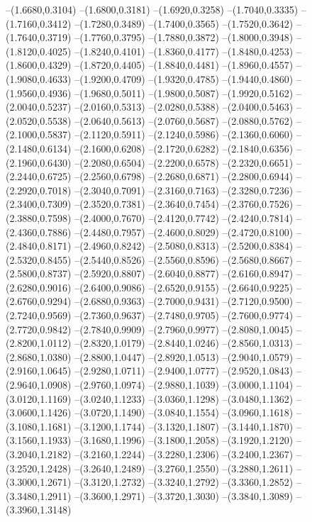 {\begin{scope}
--(1.6680,0.3104)
--(1.6800,0.3181)
--(1.6920,0.3258)
--(1.7040,0.3335)
--(1.7160,0.3412)
--(1.7280,0.3489)
--(1.7400,0.3565)
--(1.7520,0.3642)
--(1.7640,0.3719)
--(1.7760,0.3795)
--(1.7880,0.3872)
--(1.8000,0.3948)
--(1.8120,0.4025)
--(1.8240,0.4101)
--(1.8360,0.4177)
--(1.8480,0.4253)
--(1.8600,0.4329)
--(1.8720,0.4405)
--(1.8840,0.4481)
--(1.8960,0.4557)
--(1.9080,0.4633)
--(1.9200,0.4709)
--(1.9320,0.4785)
--(1.9440,0.4860)
--(1.9560,0.4936)
--(1.9680,0.5011)
--(1.9800,0.5087)
--(1.9920,0.5162)
--(2.0040,0.5237)
--(2.0160,0.5313)
--(2.0280,0.5388)
--(2.0400,0.5463)
--(2.0520,0.5538)
--(2.0640,0.5613)
--(2.0760,0.5687)
--(2.0880,0.5762)
--(2.1000,0.5837)
--(2.1120,0.5911)
--(2.1240,0.5986)
--(2.1360,0.6060)
--(2.1480,0.6134)
--(2.1600,0.6208)
--(2.1720,0.6282)
--(2.1840,0.6356)
--(2.1960,0.6430)
--(2.2080,0.6504)
--(2.2200,0.6578)
--(2.2320,0.6651)
--(2.2440,0.6725)
--(2.2560,0.6798)
--(2.2680,0.6871)
--(2.2800,0.6944)
--(2.2920,0.7018)
--(2.3040,0.7091)
--(2.3160,0.7163)
--(2.3280,0.7236)
--(2.3400,0.7309)
--(2.3520,0.7381)
--(2.3640,0.7454)
--(2.3760,0.7526)
--(2.3880,0.7598)
--(2.4000,0.7670)
--(2.4120,0.7742)
--(2.4240,0.7814)
--(2.4360,0.7886)
--(2.4480,0.7957)
--(2.4600,0.8029)
--(2.4720,0.8100)
--(2.4840,0.8171)
--(2.4960,0.8242)
--(2.5080,0.8313)
--(2.5200,0.8384)
--(2.5320,0.8455)
--(2.5440,0.8526)
--(2.5560,0.8596)
--(2.5680,0.8667)
--(2.5800,0.8737)
--(2.5920,0.8807)
--(2.6040,0.8877)
--(2.6160,0.8947)
--(2.6280,0.9016)
--(2.6400,0.9086)
--(2.6520,0.9155)
--(2.6640,0.9225)
--(2.6760,0.9294)
--(2.6880,0.9363)
--(2.7000,0.9431)
--(2.7120,0.9500)
--(2.7240,0.9569)
--(2.7360,0.9637)
--(2.7480,0.9705)
--(2.7600,0.9774)
--(2.7720,0.9842)
--(2.7840,0.9909)
--(2.7960,0.9977)
--(2.8080,1.0045)
--(2.8200,1.0112)
--(2.8320,1.0179)
--(2.8440,1.0246)
--(2.8560,1.0313)
--(2.8680,1.0380)
--(2.8800,1.0447)
--(2.8920,1.0513)
--(2.9040,1.0579)
--(2.9160,1.0645)
--(2.9280,1.0711)
--(2.9400,1.0777)
--(2.9520,1.0843)
--(2.9640,1.0908)
--(2.9760,1.0974)
--(2.9880,1.1039)
--(3.0000,1.1104)
--(3.0120,1.1169)
--(3.0240,1.1233)
--(3.0360,1.1298)
--(3.0480,1.1362)
--(3.0600,1.1426)
--(3.0720,1.1490)
--(3.0840,1.1554)
--(3.0960,1.1618)
--(3.1080,1.1681)
--(3.1200,1.1744)
--(3.1320,1.1807)
--(3.1440,1.1870)
--(3.1560,1.1933)
--(3.1680,1.1996)
--(3.1800,1.2058)
--(3.1920,1.2120)
--(3.2040,1.2182)
--(3.2160,1.2244)
--(3.2280,1.2306)
--(3.2400,1.2367)
--(3.2520,1.2428)
--(3.2640,1.2489)
--(3.2760,1.2550)
--(3.2880,1.2611)
--(3.3000,1.2671)
--(3.3120,1.2732)
--(3.3240,1.2792)
--(3.3360,1.2852)
--(3.3480,1.2911)
--(3.3600,1.2971)
--(3.3720,1.3030)
--(3.3840,1.3089)
--(3.3960,1.3148)

\end{scope}}
